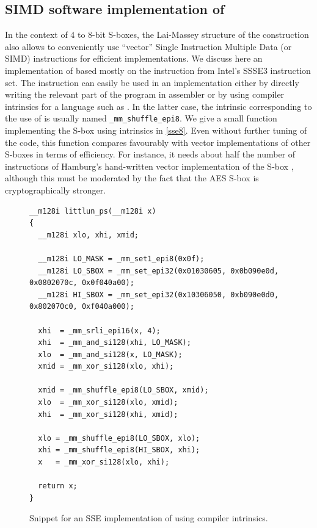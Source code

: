 \FloatBarrier

\subsection{SIMD software implementation of \littlunOne}
\label{sec:simdimplem}

In the context of 4 to 8-bit S-boxes, the Lai-Massey structure of the \littlun construction also allows to conveniently use ``vector'' Single Instruction Multiple Data (or SIMD) instructions for
efficient implementations. We discuss here an implementation of \littlunOne based mostly on the \pshufb instruction from Intel's SSSE3 instruction set.
The \pshufb instruction can easily be used in an implementation either by directly writing the relevant part of the program in assembler
or by using compiler intrinsics for a language such as \C. In the latter case, the intrinsic corresponding to the use of \pshufb is usually named \texttt{\_mm\_shuffle\_epi8}.
We give a small function implementing the \littlunOne S-box using \C intrinsics in \autoref{sse8}. Even without further tuning of the code, this function compares favourably with vector implementations
of other S-boxes in terms of efficiency. For instance, it needs about half the number of instructions of Hamburg's hand-written vector implementation of the \aes S-box \cite{vpaes}, although
this must be moderated by the fact that the AES S-box is cryptographically stronger.

\begin{figure}[ht]
\begin{verbatim}
__m128i littlun_ps(__m128i x)
{
  __m128i xlo, xhi, xmid;

  __m128i LO_MASK = _mm_set1_epi8(0x0f);
  __m128i LO_SBOX = _mm_set_epi32(0x01030605, 0x0b090e0d, 0x0802070c, 0x0f040a00);
  __m128i HI_SBOX = _mm_set_epi32(0x10306050, 0xb090e0d0, 0x802070c0, 0xf040a000);

  xhi  = _mm_srli_epi16(x, 4);
  xhi  = _mm_and_si128(xhi, LO_MASK);
  xlo  = _mm_and_si128(x, LO_MASK);
  xmid = _mm_xor_si128(xlo, xhi);

  xmid = _mm_shuffle_epi8(LO_SBOX, xmid);
  xlo  = _mm_xor_si128(xlo, xmid);
  xhi  = _mm_xor_si128(xhi, xmid);

  xlo = _mm_shuffle_epi8(LO_SBOX, xlo);
  xhi = _mm_shuffle_epi8(HI_SBOX, xhi);
  x   = _mm_xor_si128(xlo, xhi);

  return x;
}
\end{verbatim}
\caption{Snippet for an SSE \C implementation of \littlunOne using compiler intrinsics.\label{sse8}}
\end{figure}


